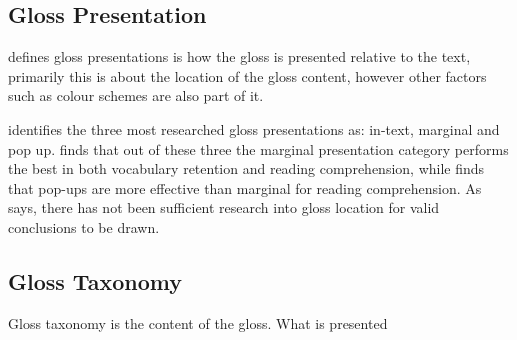 \subsection{Gloss Presentation}
\textcite{roby1999} defines gloss presentations is how the gloss is presented relative to the text, primarily this is about the location of the gloss content, however other factors such as colour schemes are also part of it.

\textcite{chen2016} identifies the three most researched gloss presentations as: in-text, marginal and pop up.  \textcite{abuseileek2008} finds that out of these three the marginal presentation category performs the best in both vocabulary retention and reading comprehension, while \textcite{marefat2016} finds that pop-ups are more effective than marginal for reading comprehension. As \textcite{chen2016} says, there has not been sufficient research into gloss location for valid conclusions to be drawn. 

\subsection{Gloss Taxonomy}
Gloss taxonomy is the content of the gloss. What is presented 

